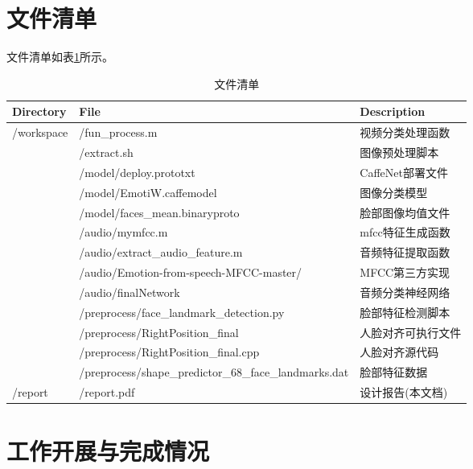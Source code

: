 \documentclass{article}
\begin{document}
\begin{multicols}{2}
    \section{文件清单}
        文件清单如表\ref{tabel:filelist}所示。
        \begin{table}[htb]
          \centering
          \begin{tabular}{lll}
            \toprule
            \textbf{Directory} & \textbf{File} & \textbf{Description} \\
            \midrule
            /workspace
                        & /fun\_process.m & 视频分类处理函数 \\
                        & /extract.sh & 图像预处理脚本 \\
                        & /model/deploy.prototxt & CaffeNet部署文件 \\
                        & /model/EmotiW.caffemodel & 图像分类模型 \\
                        & /model/faces\_mean.binaryproto & 脸部图像均值文件 \\
                        & /audio/mymfcc.m       & mfcc特征生成函数    \\
                        & /audio/extract\_audio\_feature.m & 音频特征提取函数 \\
                        & /audio/Emotion-from-speech-MFCC-master/  & MFCC第三方实现  \\
                        & /audio/finalNetwork & 音频分类神经网络    \\
                        & /preprocess/face\_landmark\_detection.py & 脸部特征检测脚本 \\
                        & /preprocess/RightPosition\_final & 人脸对齐可执行文件 \\
                        & /preprocess/RightPosition\_final.cpp & 人脸对齐源代码 \\
                        & /preprocess/shape\_predictor\_68\_face\_landmarks.dat & 脸部特征数据 \\
            \midrule
            /report     & /report.pdf & 设计报告(本文档) \\
            \bottomrule
          \end{tabular}
          \caption{文件清单}
          \label{tabel:filelist}
        \end{table}

    \section{工作开展与完成情况}

\end{multicols}
\end{document}
